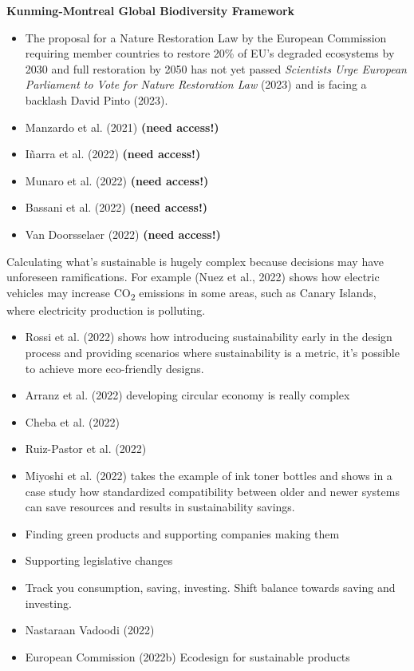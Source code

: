 \documentclass[
  letterpaper,
  DIV=11,
  numbers=noendperiod]{scrartcl}
\begin{document}
\textbf{Kunming-Montreal Global Biodiversity Framework}

\begin{itemize}
\item
  The proposal for a Nature Restoration Law by the European Commission
  requiring member countries to restore 20\% of EU's degraded ecosystems
  by 2030 and full restoration by 2050 has not yet passed
  \emph{Scientists Urge {European Parliament} to Vote for Nature
  Restoration Law} (2023) and is facing a backlash David Pinto (2023).
\item
  Manzardo et al. (2021) \textbf{(need access!)}
\item
  Iñarra et al. (2022) \textbf{(need access!)}
\item
  Munaro et al. (2022) \textbf{(need access!)}
\item
  Bassani et al. (2022) \textbf{(need access!)}
\item
  Van Doorsselaer (2022) \textbf{(need access!)}
\end{itemize}

Calculating what's sustainable is hugely complex because decisions may
have unforeseen ramifications. For example (Nuez et al., 2022) shows how
electric vehicles may increase CO\textsubscript{2} emissions in some
areas, such as Canary Islands, where electricity production is
polluting.

\begin{itemize}
\item
  Rossi et al. (2022) shows how introducing sustainability early in the
  design process and providing scenarios where sustainability is a
  metric, it's possible to achieve more eco-friendly designs.
\item
  Arranz et al. (2022) developing circular economy is really complex
\item
  Cheba et al. (2022)
\item
  Ruiz-Pastor et al. (2022)
\item
  Miyoshi et al. (2022) takes the example of ink toner bottles and shows
  in a case study how standardized compatibility between older and newer
  systems can save resources and results in sustainability savings.
\item
  Finding green products and supporting companies making them
\item
  Supporting legislative changes
\item
  Track you consumption, saving, investing. Shift balance towards saving
  and investing.
\item
  Nastaraan Vadoodi (2022)
\item
  European Commission (2022b) Ecodesign for sustainable products
\end{itemize}
\end{document}
